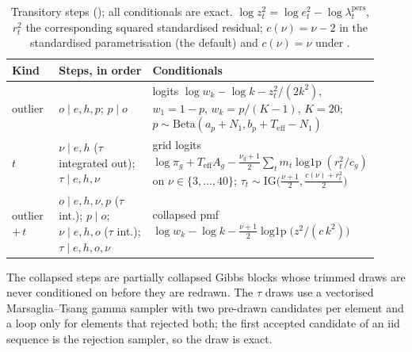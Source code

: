 \begin{table}[!htbp]
\centering\small
\caption{Transitory steps (); all conditionals are exact. $\log
z_t^2 = \log e_t^2 - \log\lambda^{\mathrm{pers}}_t$, $r_t^2$ the corresponding squared standardised
residual; $c(\nu) = \nu - 2$ in the standardised parametrisation (the default) and $c(\nu) = \nu$
under .}
\label{tab:C-transitory}
\begin{tabular}{@{}p{0.13\linewidth}p{0.27\linewidth}p{0.52\linewidth}@{}}
\toprule
Kind & Steps, in order & Conditionals \\
\midrule
outlier & $o \mid e, h, p$; $p \mid o$ & logits $\log w_k - \log k - z_t^2/(2k^2)$, $w_1 = 1 - p$, $w_k = p/(K-1)$, $K = 20$; $p \sim \mathrm{Beta}(a_p + N_1, b_p + T_{\mathrm{eff}} - N_1)$ \\
$t$ & $\nu \mid e, h$ ($\tau$ integrated out); $\tau \mid e, h, \nu$ & grid logits $\log\pi_g + T_{\mathrm{eff}}A_g - \frac{\nu_g + 1}{2}\sum_t m_t\operatorname{log1p}(r_t^2/c_g)$ on $\nu \in \{3, \dots, 40\}$; $\tau_t \sim \mathrm{IG}\big(\frac{\nu+1}{2}, \frac{c(\nu) + r_t^2}{2}\big)$ \\
outlier $+\,t$ & $o \mid e, h, \nu, p$ ($\tau$ int.); $p \mid o$; $\nu \mid e, h, o$ ($\tau$ int.); $\tau \mid e, h, o, \nu$ & collapsed pmf $\log w_k - \log k - \frac{\nu+1}{2}\operatorname{log1p}\big(z^2/(c\,k^2)\big)$ \\
\bottomrule
\end{tabular}
\end{table}

The collapsed steps are partially collapsed Gibbs blocks \citep{vandyk2008partially} whose trimmed
draws are never conditioned on before they are redrawn.
The $\tau$ draws use a vectorised Marsaglia--Tsang gamma sampler \citep{marsaglia2000simple} with
two pre-drawn candidates per element and a loop only for elements that rejected both; the first
accepted candidate of an iid sequence is the rejection sampler, so the draw is exact.

